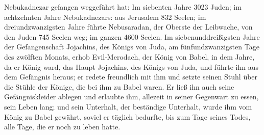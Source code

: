 Nebukadnezar gefangen weggeführt hat: Im siebenten Jahre 3023 Juden;
 im achtzehnten Jahre Nebukadnezars: aus Jerusalem 832
Seelen;  im dreiundzwanzigsten Jahre führte Nebusaradan,
der Oberste der Leibwache, von den Juden 745 Seelen weg; im ganzen 4600
Seelen.  Im siebenunddreißigsten Jahre der Gefangenschaft
Jojachins, des Königs von Juda, am fünfundzwanzigsten Tage des zwölften
Monats, erhob Evil-Merodach, der König von Babel, in dem Jahre, da er
König ward, das Haupt Jojachins, des Königs von Juda, und führte ihn aus
dem Gefängnis heraus;  er redete freundlich mit ihm und
setzte seinen Stuhl über die Stühle der Könige, die bei ihm zu Babel
waren.  Er ließ ihn auch seine Gefängniskleider ablegen
und erlaubte ihm, allezeit in seiner Gegenwart zu essen, sein Leben
lang;  und sein Unterhalt, der beständige Unterhalt,
wurde ihm vom König zu Babel gewährt, soviel er täglich bedurfte, bis
zum Tage seines Todes, alle Tage, die er noch zu leben hatte.

